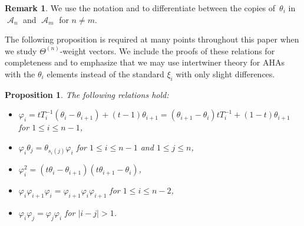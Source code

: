 \documentclass[10pt,a4paper]{amsart}
\numberwithin{equation}{section}
\newtheorem{Proposition}[Theorem]{Proposition}
\theoremstyle{definition}
\newtheorem{Remark}[Theorem]{Remark}
\DeclareMathOperator{\sA}{\mathscr{A}}
\begin{document}
\begin{Remark}
 We use the notation  and  to differentiate between the copies of~$\theta_i$ in~$\sA_n$ and $\sA_m$ for $n \neq m$.
\end{Remark}

The following proposition is required at many points throughout this paper when we study $\Theta^{(n)}$-weight vectors. We include the proofs of these relations for completeness and to emphasize that we may use intertwiner theory for AHAs with the $\theta_i$ elements instead of the standard $\xi_i$ with only slight differences.

\begin{Proposition}\label{additional relations for affine hecke}
 The following relations hold:
 \begin{itemize}
\itemsep=0pt
 \item $\varphi_i = tT_{i}^{-1}(\theta_i - \theta_{i+1}) + (t-1)\theta_{i+1} = (\theta_{i+1}-\theta_i)tT_i^{-1} + (1-t)\theta_{i+1}$ for $1 \leq i \leq n-1$,
 \item $\varphi_{i}\theta_j = \theta_{s_i(j)}\varphi_{i}$ for $1\leq i \leq n-1$ and $1 \leq j \leq n$,
 \item $\varphi_i^{2} = (t\theta_i-\theta_{i+1})(t\theta_{i+1}-\theta_{i})$,
 \item $\varphi_i\varphi_{i+1}\varphi_i=\varphi_{i+1}\varphi_i\varphi_{i+1}$ for $1\leq i \leq n-2$,
 \item $\varphi_i\varphi_j = \varphi_j\varphi_i$ for $|i-j| >1$.
 \end{itemize}
\end{Proposition}
\end{document}
